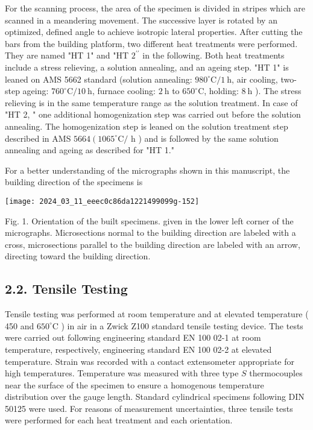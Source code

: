 \documentclass[10pt]{article}
\begin{document}
For the scanning process, the area of the specimen is divided in stripes which are scanned in a meandering movement. The successive layer is rotated by an optimized, defined angle to achieve isotropic lateral properties. After cutting the bars from the building platform, two different heat treatments were performed. They are named "HT 1" and "HT $2^{\prime \prime}$ in the following. Both heat treatments include a stress relieving, a solution annealing, and an ageing step. "HT 1" is leaned on AMS 5662 standard (solution annealing: $980^{\circ} \mathrm{C} / 1 \mathrm{~h}$, air cooling, two-step ageing: $760^{\circ} \mathrm{C} / 10 \mathrm{~h}$, furnace cooling: $2 \mathrm{~h}$ to $650^{\circ} \mathrm{C}$, holding: $8 \mathrm{~h}$ ). The stress relieving is in the same temperature range as the solution treatment. In case of "HT 2, " one additional homogenization step was carried out before the solution annealing. The homogenization step is leaned on the solution treatment step described in AMS $5664\left(1065^{\circ} \mathrm{C} /\right.$ $\mathrm{h}$ ) and is followed by the same solution annealing and ageing as described for "HT 1."

For a better understanding of the micrographs shown in this manuscript, the building direction of the specimens is

\begin{center}
\texttt{[image: 2024\_03\_11\_eeec0c86da1221499099g-152]}
\end{center}

Fig. 1. Orientation of the built specimens. given in the lower left corner of the micrographs. Microsections normal to the building direction are labeled with a cross, microsections parallel to the building direction are labeled with an arrow, directing toward the building direction.

\subsection*{2.2. Tensile Testing}
Tensile testing was performed at room temperature and at elevated temperature ( 450 and $650^{\circ} \mathrm{C}$ ) in air in a Zwick Z100 standard tensile testing device. The tests were carried out following engineering standard EN 100 02-1 at room temperature, respectively, engineering standard EN 100 02-2 at elevated temperature. Strain was recorded with a contact extensometer appropriate for high temperatures. Temperature was measured with three type $S$ thermocouples near the surface of the specimen to ensure a homogenous temperature distribution over the gauge length. Standard cylindrical specimens following DIN 50125 were used. For reasons of measurement uncertainties, three tensile tests were performed for each heat treatment and each orientation.
\end{document}
